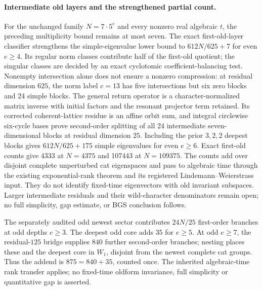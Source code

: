 \paragraph{Intermediate old layers and the strengthened partial count.}
For the unchanged family $N=7\cdot5^e$ and every nonzero real algebraic
$t$, the preceding multiplicity bound remains at most seven. The exact
first-old-layer classifier strengthens the simple-eigenvalue lower bound to
$612N/625+7$ for even $e\ge4$. Its regular norm classes contribute half of
the first-old quotient; the singular classes are decided by an exact
cyclotomic coefficient-balancing test. Nonempty intersection alone does
not ensure a nonzero compression: at residual dimension $625$, the norm
label $c=13$ has five intersections but six zero blocks and 24 simple blocks.
The general return operator is a character-normalized matrix inverse with
initial factors and the resonant projector term retained. Its corrected
coherent-lattice residue is an affine orbit sum, and integral circlewise
six-cycle bases prove second-order splitting of all 24 intermediate
seven-dimensional blocks at residual dimension $25$. Including the prior
$3,2,2$ deepest blocks gives $612N/625+175$ simple eigenvalues for even
$e\ge6$. Exact first-old counts give 4333 at $N=4375$ and 107443 at
$N=109375$. The counts add over disjoint complete unperturbed cat eigenspaces
and pass to algebraic time through the existing exponential-rank theorem
and its registered Lindemann--Weierstrass input. They do not identify
fixed-time eigenvectors with old invariant subspaces. Larger intermediate
residuals and their wild-character denominators remain open; no full
simplicity, gap estimate, or BGS conclusion follows.

The separately audited odd newest sector contributes $24N/25$ first-order
branches at odd depths $e\ge3$. The deepest odd core adds $35$ for $e\ge5$.
At odd $e\ge7$, the residual-$125$ bridge supplies $840$ further second-order
branches; nesting places these and the deepest core in $W_1$, disjoint from
the newest complete cat groups. Thus the addend is $875=840+35$, counted once.
The inherited algebraic-time rank transfer applies; no fixed-time oldform
invariance, full simplicity or quantitative gap is asserted.
